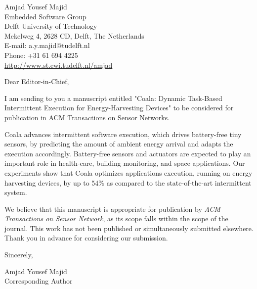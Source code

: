 \documentclass[11pt]{article}
\makeatletter
\def\Who{Amjad Yousef Majid}
\def\What{}
\def\Where{Embedded Software Group}
\def\Affiliation{Delft University of Technology}
\def\Address{Mekelweg 4, 2628 CD, Delft, The Netherlands}
\def\Email{E-mail:  a.y.majid@tudelft.nl}
\def\Telephone{Phone: +31 61 694 4225}
\def\Webpage{\url{http://www.st.ewi.tudelft.nl/amjad}}
\def\Sender{
	
	\begin{flushright}
		\Who \What \\
		\Where \\
		\Affiliation \\
		\Address \\
		\Email \\
		\Telephone \\
		\Webpage
	\end{flushright}	
}
\makeatother
\begin{document}
	
	\thispagestyle{empty}
	
	\Sender

	\bigskip
	
	Dear Editor-in-Chief,

	I am sending to you a manuscript entitled "Coala: Dynamic Task-Based Intermittent Execution for Energy-Harvesting Devices" to be considered for publication in ACM Transactions on Sensor Networks. 

	Coala advances intermittent software execution, which drives battery-free tiny sensors, by predicting the amount of ambient energy arrival and adapts the execution accordingly. Battery-free sensors and actuators are expected to play an important role in health-care, building monitoring, and space applications. Our experiments show that Coala optimizes applications execution, running on energy harvesting devices, by up to 54\% as compared to the state-of-the-art intermittent system. 


	We believe that this manuscript is appropriate for publication by \emph{ACM Transactions on Sensor Network}, as its scope falls within the scope of the journal. This work has not been published or simultaneously submitted elsewhere. Thank you in advance for considering our submission.
		
	\vspace{0.3cm}
	
	Sincerely,
	
	\Who \\
	Corresponding Author
	 
	
\end{document}
